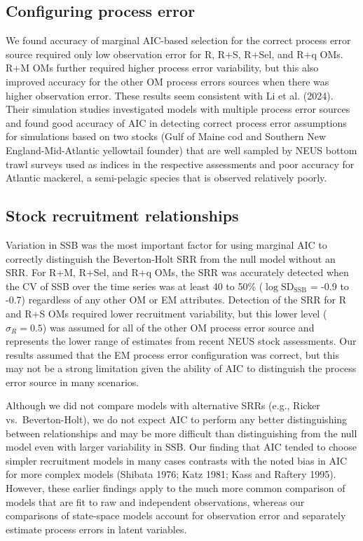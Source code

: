 \documentclass[
  12pt,
]{article}
\begin{document}
\subsection*{Configuring process error}\label{configuring-process-error}

We found accuracy of marginal AIC-based selection for the correct
process error source required only low observation error for R, R+S,
R+Sel, and R+q OMs. R+M OMs further required higher process error
variability, but this also improved accuracy for the other OM process
errors sources when there was higher observation error. These results
seem consistent with Li et al. (2024). Their simulation studies
investigated models with multiple process error sources and found good
accuracy of AIC in detecting correct process error assumptions for
simulations based on two stocks (Gulf of Maine cod and Southern New
England-Mid-Atlantic yellowtail founder) that are well sampled by NEUS
bottom trawl surveys used as indices in the respective assessments and
poor accuracy for Atlantic mackerel, a semi-pelagic species that is
observed relatively poorly.

\subsection*{Stock recruitment
relationships}\label{stock-recruitment-relationships}

Variation in SSB was the most important factor for using marginal AIC to
correctly distinguish the Beverton-Holt SRR from the null model without
an SRR. For R+M, R+Sel, and R+q OMs, the SRR was accurately detected
when the CV of SSB over the time series was at least 40 to 50\%
(\(\log \text{SD}_{\text{SSB}}\) = -0.9 to -0.7) regardless of any other
OM or EM attributes. Detection of the SRR for R and R+S OMs required
lower recruitment variability, but this lower level (\(\sigma_R = 0.5\))
was assumed for all of the other OM process error source and represents
the lower range of estimates from recent NEUS stock assessments. Our
results assumed that the EM process error configuration was correct, but
this may not be a strong limitation given the ability of AIC to
distinguish the process error source in many scenarios.

Although we did not compare models with alternative SRRs (e.g., Ricker
vs.~Beverton-Holt), we do not expect AIC to perform any better
distinguishing between relationships and may be more difficult than
distinguishing from the null model even with larger variability in SSB.
Our finding that AIC tended to choose simpler recruitment models in many
cases contrasts with the noted bias in AIC for more complex models
(Shibata 1976; Katz 1981; Kass and Raftery 1995). However, these earlier
findings apply to the much more common comparison of models that are fit
to raw and independent observations, whereas our comparisons of
state-space models account for observation error and separately estimate
process errors in latent variables.
\end{document}
